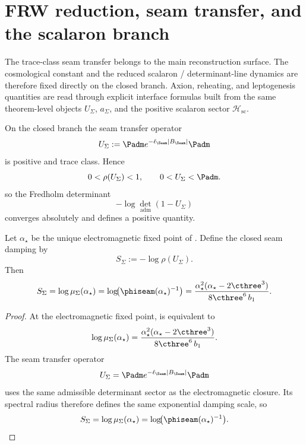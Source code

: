 
\section{FRW reduction, seam transfer, and the scalaron branch}
\label{sec:cosmology-closure}

The trace-class seam transfer belongs to the main reconstruction surface. The cosmological
constant and the reduced scalaron / determinant-line dynamics are therefore fixed directly on the
closed branch. Axion, reheating, and leptogenesis quantities are read through explicit interface
formulas built from the same theorem-level objects $U_\Sigma$, $a_\Sigma$, and the positive
scalaron sector $\mathcal H_{\mathrm{sc}}$.

\begin{theorem}
\label{lem:automatic-seam-transfer-convergence}
On the closed branch the seam transfer operator
\[
U_\Sigma:=\Padm e^{-\ell_\Seam|B_\Seam|}\Padm
\]
is positive and trace class. Hence
\[
0<\rho(U_\Sigma)<1,
\qquad
0<U_\Sigma<\Padm.
\]
so the Fredholm determinant
\[
-\log\det_{\mathrm{adm}}(1-U_\Sigma)
\]
converges absolutely and defines a positive quantity.
\end{theorem}

\begin{proposition}
\label{prop:seam-action-cosmology}
Let $\alpha_\star$ be the unique electromagnetic fixed point of
. Define the closed seam damping by
\[
S_\Sigma:=-\log\rho(U_\Sigma).
\]
Then
\[
S_\Sigma
=
\log\mu_\Sigma(\alpha_\star)
=
\log\!\bigl(\phiseam(\alpha_\star)^{-1}\bigr)
=
\frac{\alpha_\star^2(\alpha_\star-2\cthree^3)}{8\cthree^6\,b_1}.
\]
\end{proposition}

\begin{proof}
At the electromagnetic fixed point,  is equivalent to
\[
\log\mu_\Sigma(\alpha_\star)
=
\frac{\alpha_\star^2(\alpha_\star-2\cthree^3)}{8\cthree^6\,b_1}.
\]
The seam transfer operator
\[
U_\Sigma=\Padm e^{-\ell_\Seam|B_\Seam|}\Padm
\]
uses the same admissible determinant sector as the electromagnetic closure. Its spectral radius
therefore defines the same exponential damping scale, so
\[
S_\Sigma
=
\log\mu_\Sigma(\alpha_\star)
=
\log\!\bigl(\phiseam(\alpha_\star)^{-1}\bigr).
\]
\end{proof}

